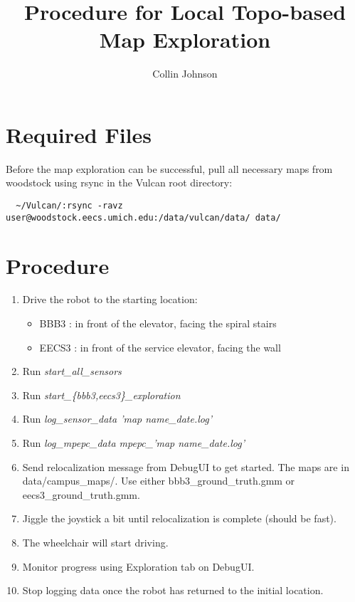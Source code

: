 \documentclass{article}
\title{Procedure for Local Topo-based Map Exploration}
\author{Collin Johnson}
\begin{document}
\maketitle

\section{Required Files}

Before the map exploration can be successful, pull all necessary maps from woodstock using rsync in the Vulcan root 
directory:

\begin{verbatim}
  ~/Vulcan/:rsync -ravz user@woodstock.eecs.umich.edu:/data/vulcan/data/ data/
\end{verbatim}

\section{Procedure}

\begin{enumerate}
  \item Drive the robot to the starting location:
    \begin{itemize}
     \item BBB3 : in front of the elevator, facing the spiral stairs
     \item EECS3 : in front of the service elevator, facing the wall
    \end{itemize}
  \item Run \emph{start\_all\_sensors}
  \item Run \emph{start\_\{bbb3,eecs3\}\_exploration}
  \item Run \emph{log\_sensor\_data 'map name\_date.log'}
  \item Run \emph{log\_mpepc\_data mpepc\_'map name\_date.log'}
  \item Send relocalization message from DebugUI to get started. The maps are in data/campus\_maps/. Use either 
bbb3\_ground\_truth.gmm or eecs3\_ground\_truth.gmm.
  \item Jiggle the joystick a bit until relocalization is complete (should be fast).
  \item The wheelchair will start driving.
  \item Monitor progress using Exploration tab on DebugUI.
  \item Stop logging data once the robot has returned to the initial location.
\end{enumerate}
\end{document}
